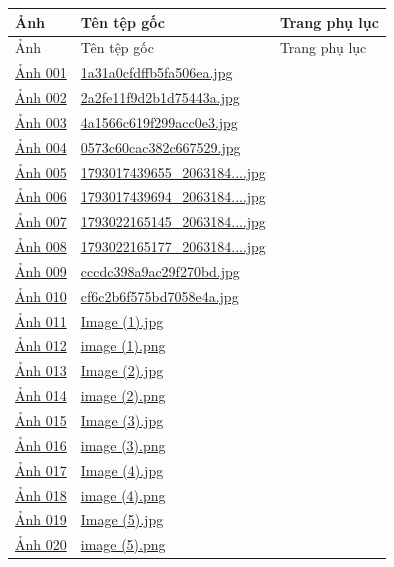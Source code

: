 \small
\begin{longtable}{p{}p{}p{}}
\toprule
Ảnh & Tên tệp gốc & Trang phụ lục\\
\midrule
\endfirsthead
\toprule
Ảnh & Tên tệp gốc & Trang phụ lục\\
\midrule
\endhead
\hyperref[src:001]{Ảnh 001} & \url{1a31a0cfdffb5fa506ea.jpg} & \pageref{src:001}\\
\hyperref[src:002]{Ảnh 002} & \url{2a2fe11f9d2b1d75443a.jpg} & \pageref{src:002}\\
\hyperref[src:003]{Ảnh 003} & \url{4a1566c619f299acc0e3.jpg} & \pageref{src:003}\\
\hyperref[src:004]{Ảnh 004} & \url{0573c60cac382c667529.jpg} & \pageref{src:004}\\
\hyperref[src:005]{Ảnh 005} & \url{1793017439655_2063184....jpg} & \pageref{src:005}\\
\hyperref[src:006]{Ảnh 006} & \url{1793017439694_2063184....jpg} & \pageref{src:006}\\
\hyperref[src:007]{Ảnh 007} & \url{1793022165145_2063184....jpg} & \pageref{src:007}\\
\hyperref[src:008]{Ảnh 008} & \url{1793022165177_2063184....jpg} & \pageref{src:008}\\
\hyperref[src:009]{Ảnh 009} & \url{cccdc398a9ac29f270bd.jpg} & \pageref{src:009}\\
\hyperref[src:010]{Ảnh 010} & \url{cf6c2b6f575bd7058e4a.jpg} & \pageref{src:010}\\
\hyperref[src:011]{Ảnh 011} & \url{Image (1).jpg} & \pageref{src:011}\\
\hyperref[src:012]{Ảnh 012} & \url{image (1).png} & \pageref{src:012}\\
\hyperref[src:013]{Ảnh 013} & \url{Image (2).jpg} & \pageref{src:013}\\
\hyperref[src:014]{Ảnh 014} & \url{image (2).png} & \pageref{src:014}\\
\hyperref[src:015]{Ảnh 015} & \url{Image (3).jpg} & \pageref{src:015}\\
\hyperref[src:016]{Ảnh 016} & \url{image (3).png} & \pageref{src:016}\\
\hyperref[src:017]{Ảnh 017} & \url{Image (4).jpg} & \pageref{src:017}\\
\hyperref[src:018]{Ảnh 018} & \url{image (4).png} & \pageref{src:018}\\
\hyperref[src:019]{Ảnh 019} & \url{Image (5).jpg} & \pageref{src:019}\\
\hyperref[src:020]{Ảnh 020} & \url{image (5).png} & \pageref{src:020}\\

\end{longtable}
